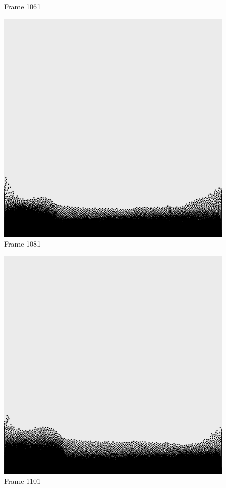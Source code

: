 \documentclass[a4paper, 12pt, oneside]{book}
\begin{document}
\begin{figure}[!ht]
\begin{center}
            Frame 1061
        \end{center}
    \endminipage
    \hfill
        \begin{center}
            \includegraphics[width=\linewidth]{images/test_case_2/1081.png}
            Frame 1081
        \end{center}
    \endminipage
    \hfill
        \begin{center}
            \includegraphics[width=\linewidth]{images/test_case_2/1101.png}
            Frame 1101
        \end{center}
    \endminipage
    \hfill


\end{figure}
\end{document}
